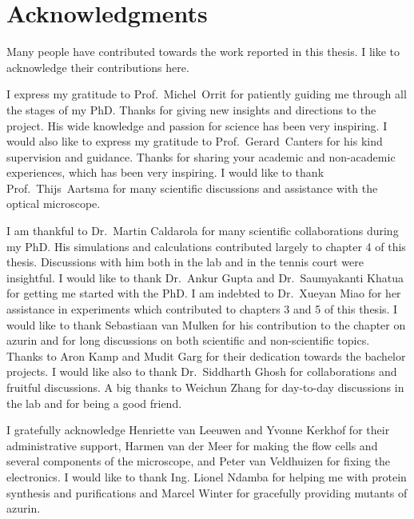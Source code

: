 \chapter*{Acknowledgments}
\label{ch:Acknowledgments}

Many people have contributed towards the work reported in this thesis.
I like to acknowledge their contributions here.

I express my gratitude to Prof.~Michel~Orrit for patiently guiding me through all the stages of my PhD.
Thanks for giving new insights and directions to the project.
His wide knowledge and passion for science has been very inspiring.
I would also like to express my gratitude to Prof.~Gerard~Canters for his kind supervision and guidance.
Thanks for sharing your academic and non-academic experiences, which has been very inspiring.
I would like to thank Prof.~Thijs~Aartsma for many scientific discussions and assistance with the optical microscope.

I am thankful to Dr.~Martin Caldarola for many scientific collaborations during my PhD.
His simulations and calculations contributed largely to chapter 4 of this thesis.
Discussions with him both in the lab and in the tennis court were insightful.
I would like to thank Dr.~Ankur Gupta and Dr.~Saumyakanti Khatua for getting me started with the PhD.
I am indebted to Dr.~Xueyan Miao for her assistance in experiments which contributed to chapters 3 and 5 of this thesis.
I would like to thank Sebastiaan van Mulken for his contribution to the chapter on azurin and for long discussions on both scientific and non-scientific topics.
Thanks to Aron Kamp and Mudit Garg for their dedication towards the bachelor projects.
I would like also to thank Dr.~Siddharth Ghosh for collaborations and fruitful discussions.
A big thanks to Weichun Zhang for day-to-day discussions in the lab and for being a good friend. 

I gratefully acknowledge Henriette van Leeuwen and Yvonne Kerkhof for their administrative support, Harmen van der Meer for making the flow cells and several components of the microscope, and Peter van Veldhuizen for fixing the electronics.
I would like to thank Ing. Lionel Ndamba for helping me with protein synthesis and purifications and Marcel Winter for gracefully providing mutants of azurin. 

